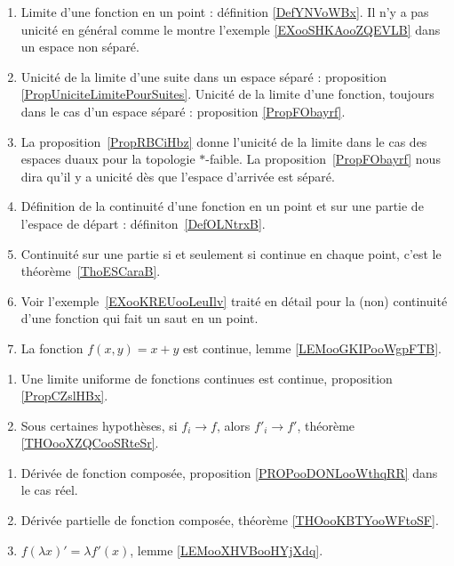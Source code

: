 \begin{enumerate}
    \item
        Limite d'une fonction en un point : définition \ref{DefYNVoWBx}. Il n'y a pas unicité en général comme le montre l'exemple \ref{EXooSHKAooZQEVLB} dans un espace non séparé.
    \item
        Unicité de la limite d'une suite dans un espace séparé : proposition \ref{PropUniciteLimitePourSuites}. Unicité de la limite d'une fonction, toujours dans le cas d'un espace séparé : proposition \ref{PropFObayrf}.
    \item
        La proposition~\ref{PropRBCiHbz} donne l'unicité de la limite dans le cas des espaces duaux pour la topologie \( *\)-faible. La proposition~\ref{PropFObayrf} nous dira qu'il y a unicité dès que l'espace d'arrivée est séparé.
    \item
        Définition de la continuité d'une fonction en un point et sur une partie de l'espace de départ : définiton~\ref{DefOLNtrxB}.
    \item
        Continuité sur une partie si et seulement si continue en chaque point, c'est le théorème~\ref{ThoESCaraB}.
    \item
        Voir l'exemple~\ref{EXooKREUooLeuIlv} traité en détail pour la (non) continuité d'une fonction qui fait un saut en un point.
    \item
        La fonction \( f(x,y)=x+y\) est continue, lemme \ref{LEMooGKIPooWgpFTB}.
\end{enumerate}

\begin{enumerate}
    \item
        Une limite uniforme de fonctions continues est continue, proposition \ref{PropCZslHBx}.
    \item
        Sous certaines hypothèses, si \( f_i\to f\), alors \( f'_i\to f'\), théorème \ref{THOooXZQCooSRteSr}.
\end{enumerate}

\begin{enumerate}
    \item
        Dérivée de fonction composée, proposition \ref{PROPooDONLooWthqRR} dans le cas réel.
    \item
        Dérivée partielle de fonction composée, théorème \ref{THOooKBTYooWFtoSF}.
    \item
        \( f(\lambda x)'=\lambda f'(x)\), lemme \ref{LEMooXHVBooHYjXdq}.
\end{enumerate}

